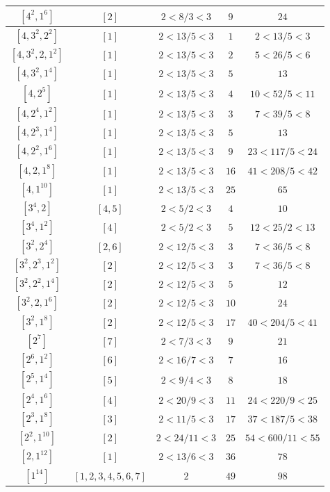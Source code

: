 \documentclass{article}%
\begin{document}
\begin{center}
\begin{longtable}{||c|c|c|c|c||}
$[4^{2}, 1^{6}]$ & $[2]$ & $2 < 8/3 < 3$ & $9$ & $24$ \\ \hline 
$[4, 3^{2}, 2^{2}]$ & $[1]$ & $2 < 13/5 < 3$ & $1$ & $2 < 13/5 < 3$ \\ \hline 
$[4, 3^{2}, 2, 1^{2}]$ & $[1]$ & $2 < 13/5 < 3$ & $2$ & $5 < 26/5 < 6$ \\ \hline 
$[4, 3^{2}, 1^{4}]$ & $[1]$ & $2 < 13/5 < 3$ & $5$ & $13$ \\ \hline 
$[4, 2^{5}]$ & $[1]$ & $2 < 13/5 < 3$ & $4$ & $10 < 52/5 < 11$ \\ \hline 
$[4, 2^{4}, 1^{2}]$ & $[1]$ & $2 < 13/5 < 3$ & $3$ & $7 < 39/5 < 8$ \\ \hline 
$[4, 2^{3}, 1^{4}]$ & $[1]$ & $2 < 13/5 < 3$ & $5$ & $13$ \\ \hline 
$[4, 2^{2}, 1^{6}]$ & $[1]$ & $2 < 13/5 < 3$ & $9$ & $23 < 117/5 < 24$ \\ \hline 
$[4, 2, 1^{8}]$ & $[1]$ & $2 < 13/5 < 3$ & $16$ & $41 < 208/5 < 42$ \\ \hline 
$[4, 1^{10}]$ & $[1]$ & $2 < 13/5 < 3$ & $25$ & $65$ \\ \hline 
$[3^{4}, 2]$ & $[4, 5]$ & $2 < 5/2 < 3$ & $4$ & $10$ \\ \hline 
$[3^{4}, 1^{2}]$ & $[4]$ & $2 < 5/2 < 3$ & $5$ & $12 < 25/2 < 13$ \\ \hline 
$[3^{2}, 2^{4}]$ & $[2, 6]$ & $2 < 12/5 < 3$ & $3$ & $7 < 36/5 < 8$ \\ \hline 
$[3^{2}, 2^{3}, 1^{2}]$ & $[2]$ & $2 < 12/5 < 3$ & $3$ & $7 < 36/5 < 8$ \\ \hline 
$[3^{2}, 2^{2}, 1^{4}]$ & $[2]$ & $2 < 12/5 < 3$ & $5$ & $12$ \\ \hline 
$[3^{2}, 2, 1^{6}]$ & $[2]$ & $2 < 12/5 < 3$ & $10$ & $24$ \\ \hline 
$[3^{2}, 1^{8}]$ & $[2]$ & $2 < 12/5 < 3$ & $17$ & $40 < 204/5 < 41$ \\ \hline 
$[2^{7}]$ & $[7]$ & $2 < 7/3 < 3$ & $9$ & $21$ \\ \hline 
$[2^{6}, 1^{2}]$ & $[6]$ & $2 < 16/7 < 3$ & $7$ & $16$ \\ \hline 
$[2^{5}, 1^{4}]$ & $[5]$ & $2 < 9/4 < 3$ & $8$ & $18$ \\ \hline 
$[2^{4}, 1^{6}]$ & $[4]$ & $2 < 20/9 < 3$ & $11$ & $24 < 220/9 < 25$ \\ \hline 
$[2^{3}, 1^{8}]$ & $[3]$ & $2 < 11/5 < 3$ & $17$ & $37 < 187/5 < 38$ \\ \hline 
$[2^{2}, 1^{10}]$ & $[2]$ & $2 < 24/11 < 3$ & $25$ & $54 < 600/11 < 55$ \\ \hline 
$[2, 1^{12}]$ & $[1]$ & $2 < 13/6 < 3$ & $36$ & $78$ \\ \hline 
$[1^{14}]$ & $[1, 2, 3, 4, 5, 6, 7]$ & $2$ & $49$ & $98$ \\ \hline 
    \end{longtable}
    \end{center}
\newpage
\end{document}
